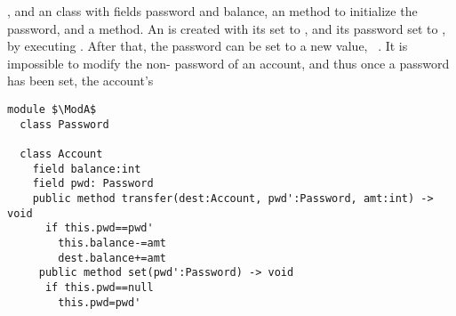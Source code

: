 , and an  class with fields  password and  balance, an  method to initialize the password, and  a  method. 
An  is created with its  set to , and its password set to , \eg by executing .
 After that, the password can be set to a new value,  \eg\,   . 
It is impossible to modify the  non- password of an account, and thus once a password has been set, the account's 
 

\begin{lstlisting}[mathescape=true, language=Chainmail, frame=lines]
module $\ModA$        
  class Password
  
  class Account
    field balance:int 
    field pwd: Password
    public method transfer(dest:Account, pwd':Password, amt:int) -> void
      if this.pwd==pwd'
        this.balance-=amt
        dest.balance+=amt
     public method set(pwd':Password) -> void
      if this.pwd==null
        this.pwd=pwd'
\end{lstlisting}
%
\noindent 
%
 
